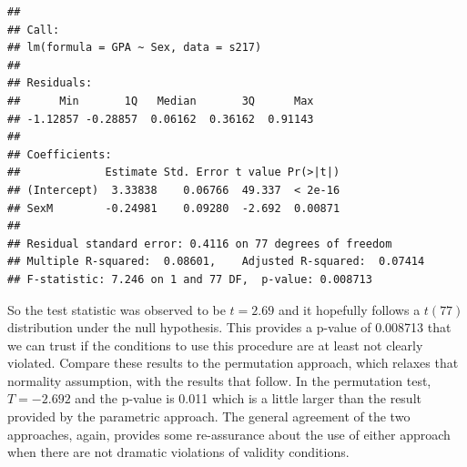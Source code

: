 \documentclass[
]{book}
\newenvironment{Shaded}{\begin{snugshade}}{\end{snugshade}}
\newcommand{\AttributeTok}[1]{\textcolor[rgb]{0.77,0.63,0.00}{#1}}
\newcommand{\ConstantTok}[1]{\textcolor[rgb]{0.00,0.00,0.00}{#1}}
\newcommand{\ControlFlowTok}[1]{\textcolor[rgb]{0.13,0.29,0.53}{\textbf{#1}}}
\newcommand{\DecValTok}[1]{\textcolor[rgb]{0.00,0.00,0.81}{#1}}
\newcommand{\FunctionTok}[1]{\textcolor[rgb]{0.00,0.00,0.00}{#1}}
\newcommand{\NormalTok}[1]{#1}
\newcommand{\OtherTok}[1]{\textcolor[rgb]{0.56,0.35,0.01}{#1}}
\newcommand{\SpecialCharTok}[1]{\textcolor[rgb]{0.00,0.00,0.00}{#1}}
\begin{document}
\begin{verbatim}
## 
## Call:
## lm(formula = GPA ~ Sex, data = s217)
## 
## Residuals:
##      Min       1Q   Median       3Q      Max 
## -1.12857 -0.28857  0.06162  0.36162  0.91143 
## 
## Coefficients:
##             Estimate Std. Error t value Pr(>|t|)
## (Intercept)  3.33838    0.06766  49.337  < 2e-16
## SexM        -0.24981    0.09280  -2.692  0.00871
## 
## Residual standard error: 0.4116 on 77 degrees of freedom
## Multiple R-squared:  0.08601,    Adjusted R-squared:  0.07414 
## F-statistic: 7.246 on 1 and 77 DF,  p-value: 0.008713
\end{verbatim}

So the test statistic was observed to be \(t = 2.69\) and it hopefully
follows a \(t(77)\) distribution under the null hypothesis. This provides a
p-value of 0.008713 that we can trust if the conditions to use this
procedure are at least not clearly violated.
Compare these results to the permutation approach, which relaxes that normality
assumption, with the results that follow. In the permutation test, \(T = -2.692\) and
the p-value is 0.011 which is a little larger than the result provided
by the parametric approach. The general agreement of the two approaches, again, provides
some re-assurance about the use of either approach when there are not dramatic violations of validity conditions. 

\begin{Shaded}
\end{Shaded}
\end{document}
